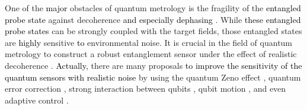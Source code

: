 \documentclass[prl,twocolumn,superscriptaddress]{revtex4}
\begin{document}
One of the \textcolor{black}{major} obstacles of quantum metrology is the fragility of the
\textcolor{black}{entangled probe state} against decoherence
\textcolor{black}{and especially dephasing}
\cite{huelga1997improvement,shaji2007qubit,demkowicz2012elusive}.
While
\textcolor{black}{these entangled probe states}
can be
strongly coupled with the target fields, those entangled states are
\textcolor{black}{highly}
sensitive
\textcolor{black}{to}
environmental noise.
It is crucial in the field of quantum metrology to construct a robust
entanglement sensor under the effect of realistic decoherence
\cite{chaves2013noisy,brask2015improved,smirne2016ultimate}.
\textcolor{black}{Actually,}
there are many proposals \textcolor{black}{to improve the sensitivity of the quantum sensors with realistic noise}
by using the quantum Zeno effect \cite{jones2009magnetic,matsuzaki2011magnetic,chin2012quantum,macieszczak2015zeno,tanaka2015proposed}, quantum error correction
\cite{kessler2014quantum,dur2014improved,arrad2014increasing,herrera2015quantum,
unden2016quantum,matsuzaki2017magnetic}, strong interaction between qubits \cite{dooley2018robust},
qubit motion
\cite{averin2016suppression,matsuzaki2016hybrid,matsuzaki2018quantum},
and even adaptive control \cite{pang2017optimal,demkowicz2017adaptive}.
\end{document}
